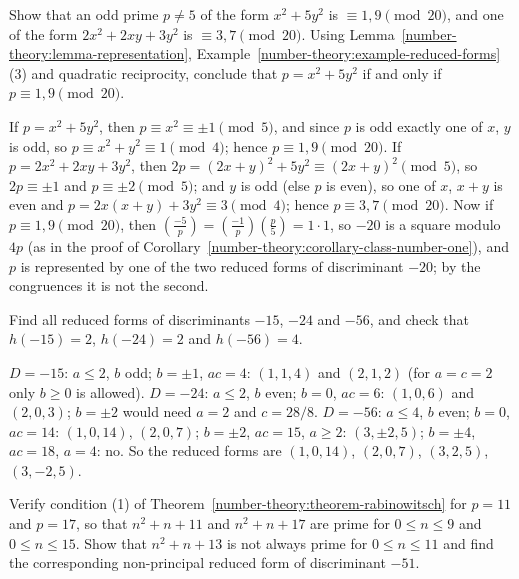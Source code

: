 \begin{exercise}\label{number-theory:exercise-x2-5y2}
Show that an odd prime $p \neq 5$ of the form $x^2 + 5y^2$ is $\equiv 1, 9 \pmod{20}$, and one of the form $2x^2 + 2xy + 3y^2$ is $\equiv 3, 7 \pmod{20}$. Using Lemma~\ref{number-theory:lemma-representation},
Example~\ref{number-theory:example-reduced-forms}(3) and quadratic reciprocity, conclude that $p = x^2 + 5y^2$ if and only if $p \equiv 1, 9 \pmod{20}$.
\end{exercise}

\begin{solution}
If $p = x^2 + 5y^2$, then $p \equiv x^2 \equiv \pm1 \pmod 5$, and since $p$ is odd exactly one of $x$, $y$ is odd, so $p \equiv x^2 + y^2 \equiv 1 \pmod 4$; hence $p \equiv 1, 9 \pmod{20}$. If
$p = 2x^2 + 2xy + 3y^2$, then $2p = (2x + y)^2 + 5y^2 \equiv (2x + y)^2 \pmod 5$, so $2p \equiv \pm1$ and $p \equiv \pm2 \pmod 5$; and $y$ is odd (else $p$ is even), so one of $x$, $x + y$ is even and
$p = 2x(x + y) + 3y^2 \equiv 3 \pmod 4$; hence $p \equiv 3, 7 \pmod{20}$. Now if $p \equiv 1, 9 \pmod{20}$, then $(\frac{-5}{p}) = (\frac{-1}{p})(\frac{p}{5}) = 1 \cdot 1$, so $-20$ is a square modulo $4p$
(as in the proof of Corollary~\ref{number-theory:corollary-class-number-one}), and $p$ is represented by one of the two reduced forms of discriminant $-20$; by the congruences it is not the second.
\end{solution}

\begin{exercise}\label{number-theory:exercise-reduced-forms}
Find all reduced forms of discriminants $-15$, $-24$ and $-56$, and check that $h(-15) = 2$, $h(-24) = 2$ and $h(-56) = 4$.
\end{exercise}

\begin{solution}
$D = -15$: $a \leq 2$, $b$ odd; $b = \pm1$, $ac = 4$: $(1, 1, 4)$ and $(2, 1, 2)$ (for $a = c = 2$ only $b \geq 0$ is allowed). $D = -24$: $a \leq 2$, $b$ even; $b = 0$, $ac = 6$: $(1, 0, 6)$ and $(2, 0, 3)$;
$b = \pm2$ would need $a = 2$ and $c = 28/8$. $D = -56$: $a \leq 4$, $b$ even; $b = 0$, $ac = 14$: $(1, 0, 14)$, $(2, 0, 7)$; $b = \pm2$, $ac = 15$, $a \geq 2$: $(3, \pm2, 5)$; $b = \pm4$, $ac = 18$, $a = 4$: no.
So the reduced forms are $(1, 0, 14)$, $(2, 0, 7)$, $(3, 2, 5)$, $(3, -2, 5)$.
\end{solution}

\begin{exercise}\label{number-theory:exercise-heegner-check}
Verify condition (1) of Theorem~\ref{number-theory:theorem-rabinowitsch} for $p = 11$ and $p = 17$, so that $n^2 + n + 11$ and $n^2 + n + 17$ are prime for $0 \leq n \leq 9$ and $0 \leq n \leq 15$. Show that
$n^2 + n + 13$ is not always prime for $0 \leq n \leq 11$ and find the corresponding non-principal reduced form of discriminant $-51$.
\end{exercise}

